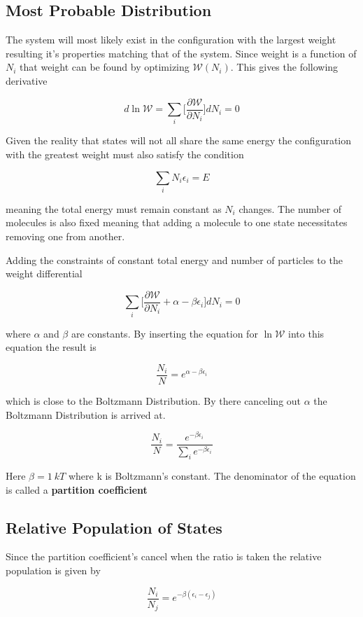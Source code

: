 \documentclass[a4paper, 12 pt]{article}
\begin{document}
\begin{flushleft}
\subsection{Most Probable Distribution}

The system will most likely exist in the configuration with the largest weight resulting it's properties matching that of the system. Since weight is a function of $N_i$ that weight can be found by optimizing $\mathscr{W}(N_i)$. This gives the following derivative

\begin{equation*}
    d \ln{\mathscr{W}} = \sum_i \big[ \frac{\partial \mathscr{W}}{\partial N_i} \big] dN_i = 0
\end{equation*}

Given the reality that states will not all share the same energy the configuration with the greatest weight must also satisfy the condition

\begin{equation*}
    \sum_i N_i \epsilon_i = E
\end{equation*}

meaning the total energy must remain constant as $N_i$ changes. The number of molecules is also fixed meaning that adding a molecule to one state necessitates removing one from another.

Adding the constraints of constant total energy and number of particles to the weight differential 

\begin{equation*}
    \sum_i \big[ \frac{\partial \mathscr{W}}{\partial N_i} + \alpha - \beta \epsilon_i \big] dN_i = 0
\end{equation*}

where $\alpha$ and $\beta$ are constants. By inserting the equation for $\ln{\mathscr{W}}$ into this equation the result is

\begin{equation*}
    \frac{N_i}{N} = e^{\alpha - \beta \epsilon_i}
\end{equation*}

which is close to the Boltzmann Distribution. By there canceling out $\alpha$ the Boltzmann Distribution is arrived at.

\begin{equation*}
    \frac{N_i}{N} = \frac{e^{-\beta \epsilon_i}}{\sum_i e^{-\beta \epsilon_i}}
\end{equation*}

Here $\beta = 1 \ kT$ where k is Boltzmann's constant. The denominator of the equation is called a \textbf{partition coefficient}

\subsection{Relative Population of States}

Since the partition coefficient's cancel when the ratio is taken the relative population is given by

\begin{equation*}
    \frac{N_i}{N_j} = e^{-\beta(\epsilon_i - \epsilon_j)}
\end{equation*}


\end{flushleft}
\end{document}

